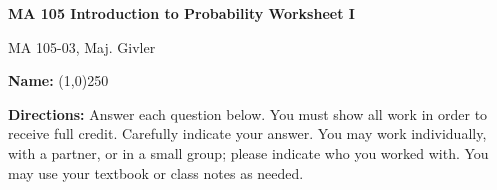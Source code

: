 \documentclass[addpoints]{exam}
\begin{document}
\begin{center}\textbf{MA 105 Introduction to Probability Worksheet I}\end{center}

\begin{bf}
MA 105-03, Maj. Givler
\end{bf}

\vspace{.5 cm}

\noindent
{\bfseries Name:} \line(1,0){250}

\noindent
{\bfseries Directions:} Answer each question below. You must show all work in order to receive full credit. Carefully indicate your answer. You may work individually, with a partner, or in a small group; please indicate who you worked with. You may use your textbook or class notes as needed.
\end{document}
